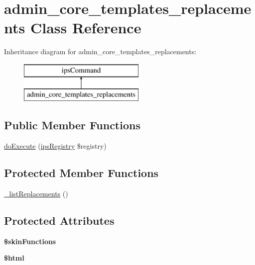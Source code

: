 \hypertarget{classadmin__core__templates__replacements}{\section{admin\-\_\-core\-\_\-templates\-\_\-replacements Class Reference}
\label{classadmin__core__templates__replacements}
}
Inheritance diagram for admin\-\_\-core\-\_\-templates\-\_\-replacements\-:\begin{figure}[H]
\begin{center}
\leavevmode
\includegraphics[height=2.000000cm]{classadmin__core__templates__replacements}
\end{center}
\end{figure}
\subsection*{Public Member Functions}
\begin{DoxyCompactItemize}
\item 
\hyperlink{classadmin__core__templates__replacements_afbc4e912a0604b94d47d66744c64d8ba}{do\-Execute} (\hyperlink{classips_registry}{ips\-Registry} \$registry)
\end{DoxyCompactItemize}
\subsection*{Protected Member Functions}
\begin{DoxyCompactItemize}
\item 
\hyperlink{classadmin__core__templates__replacements_af4aca73da66a461b1ba72f558ae07fd0}{\-\_\-list\-Replacements} ()
\end{DoxyCompactItemize}
\subsection*{Protected Attributes}
\begin{DoxyCompactItemize}
\item 
\hypertarget{classadmin__core__templates__replacements_a41d90687021c6f16184b43666509dee8}{{\bfseries \$skin\-Functions}}\label{classadmin__core__templates__replacements_a41d90687021c6f16184b43666509dee8}

\item 
\hypertarget{classadmin__core__templates__replacements_a6f96e7fc92441776c9d1cd3386663b40}{{\bfseries \$html}}\label{classadmin__core__templates__replacements_a6f96e7fc92441776c9d1cd3386663b40}

\end{DoxyCompactItemize}
